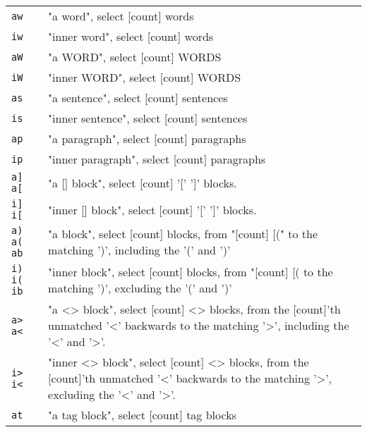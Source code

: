 \begin{tabular}{@{}ll@{}}
    \verb!aw!       & "a word", select [count] words \\
    \verb!iw!       & "inner word", select [count] words \\
    \verb!aW!       & "a WORD", select [count] WORDS \\
    \verb!iW!       & "inner WORD", select [count] WORDS \\
    \verb!as!       & "a sentence", select [count] sentences \\
    \verb!is!       & "inner sentence", select [count] sentences \\
    \verb!ap!       & "a paragraph", select [count] paragraphs \\
    \verb!ip!       & "inner paragraph", select [count] paragraphs \\
    \verb!a] a[!    & "a [] block", select [count] '[' ']' blocks. \\
    \verb!i] i[!    & "inner [] block", select [count] '[' ']' blocks. \\
    \verb!a) a( ab! & "a block", select [count] blocks, from "[count] [(" to the matching ')', including the '(' and ')' \\
    \verb!i) i( ib! & "inner block", select [count] blocks, from "[count] [( to the matching ')', excluding the '(' and ')' \\
    \verb!a> a<!    & "a <> block", select [count] <> blocks, from the [count]'th unmatched '<' backwards to the matching '>', including the '<' and '>'. \\
    \verb!i> i<!    & "inner <> block", select [count] <> blocks, from the [count]'th unmatched '<' backwards to the matching '>', excluding the '<' and '>'. \\
    \verb!at!       & "a tag block", select [count] tag blocks \\

\end{tabular}
